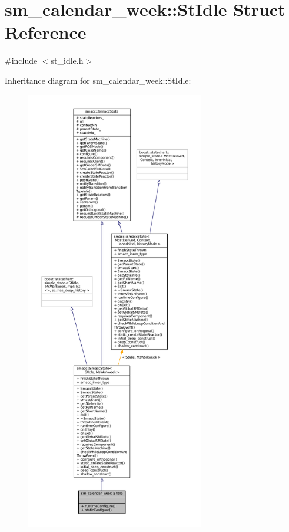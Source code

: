 \hypertarget{structsm__calendar__week_1_1StIdle}{}\section{sm\+\_\+calendar\+\_\+week\+:\+:St\+Idle Struct Reference}
\label{structsm__calendar__week_1_1StIdle}


{\ttfamily \#include $<$st\+\_\+idle.\+h$>$}



Inheritance diagram for sm\+\_\+calendar\+\_\+week\+:\+:St\+Idle\+:
\nopagebreak
\begin{figure}[H]
\begin{center}
\leavevmode
\includegraphics[height=550pt]{structsm__calendar__week_1_1StIdle__inherit__graph}
\end{center}
\end{figure}


